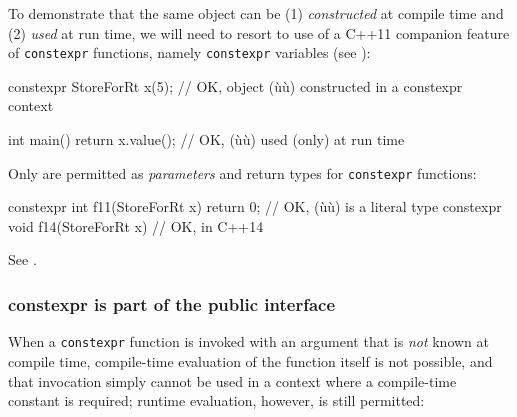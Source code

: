 To demonstrate that the same object can be (1) \emph{constructed} at
compile time and (2) \emph{used} at run time, we will need to resort to
use of a C++11 companion feature of \lstinline!constexpr! functions, namely
\lstinline!constexpr! variables (see ):

\begin{emcppslisting}[emcppsbatch=e4]
constexpr StoreForRt x(5);  // OK, object (ù{}ù) constructed in a constexpr context

int main() { return x.value(); }  // OK, (ù{}ù) used (only) at run time
\end{emcppslisting}
    

\noindent Only  are permitted as \emph{parameters} and
return types for \lstinline!constexpr! functions:

\begin{emcppslisting}[emcppsbatch=e4,emcppserrorlines={2}]
constexpr int  f11(StoreForRt x) { return 0; }  // OK, (ù{}ù) is a literal type
constexpr void f14(StoreForRt x) { }            // OK, in C++14
\end{emcppslisting}
    

\noindent See .

\subsubsection[\lstinline!constexpr! is part of the public interface]{{\SubsubsecCode constexpr} is part of the public interface}\label{constexpr-is-part-of-the-public-interface}

When a \lstinline!constexpr! function is invoked with an argument that is
\emph{not} known at compile time, compile-time evaluation of the
function itself is not possible, and that invocation simply cannot be
used in a context where a compile-time constant is required; runtime
evaluation, however, is still permitted:

